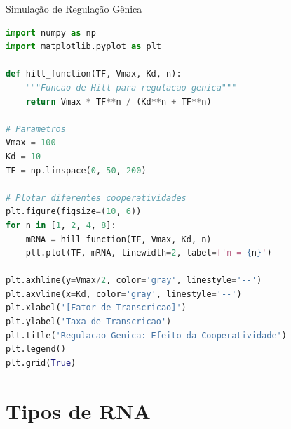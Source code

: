\begin{frame}[fragile]{Simulação de Regulação Gênica}
\begin{lstlisting}[language=Python, caption=Função de Hill, basicstyle=\ttfamily\tiny]
import numpy as np
import matplotlib.pyplot as plt

def hill_function(TF, Vmax, Kd, n):
    """Funcao de Hill para regulacao genica"""
    return Vmax * TF**n / (Kd**n + TF**n)

# Parametros
Vmax = 100
Kd = 10
TF = np.linspace(0, 50, 200)

# Plotar diferentes cooperatividades
plt.figure(figsize=(10, 6))
for n in [1, 2, 4, 8]:
    mRNA = hill_function(TF, Vmax, Kd, n)
    plt.plot(TF, mRNA, linewidth=2, label=f'n = {n}')

plt.axhline(y=Vmax/2, color='gray', linestyle='--')
plt.axvline(x=Kd, color='gray', linestyle='--')
plt.xlabel('[Fator de Transcricao]')
plt.ylabel('Taxa de Transcricao')
plt.title('Regulacao Genica: Efeito da Cooperatividade')
plt.legend()
plt.grid(True)
\end{lstlisting}
\end{frame}

\section{Tipos de RNA}

